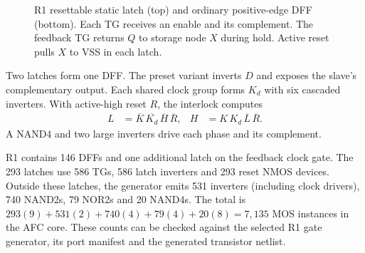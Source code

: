 \begin{figure}[t]
\centering{}
\caption{R1 resettable static latch (top) and ordinary positive-edge DFF (bottom). Each TG receives an enable and its complement. The feedback TG returns $Q$ to storage node $X$ during hold. Active reset pulls $X$ to VSS in each latch.}
\label{fig:r1afc-latch}
\end{figure}

Two latches form one DFF. The preset variant inverts $D$ and exposes
the slave's complementary output. Each shared clock group forms $K_d$
with six cascaded inverters. With active-high reset $R$, the interlock
computes
\begin{align}
 L &= \overline K\,\overline{K_d}\,\overline H\,\overline R, &
 H &= K\,K_d\,\overline L\,\overline R .
\end{align}
A NAND4 and two large inverters drive each phase and its complement.

R1 contains 146 DFFs and one additional latch on the feedback clock
gate. The 293 latches use 586 TGs, 586 latch inverters and 293 reset
NMOS devices. Outside these latches, the generator emits 531 inverters
(including clock drivers), 740 NAND2s, 79 NOR2s and 20 NAND4s. The
total is $293(9)+531(2)+740(4)+79(4)+20(8)=7{,}135$ MOS instances
in the AFC core. These counts can be checked against the selected R1
gate generator, its port manifest and the generated transistor netlist.
